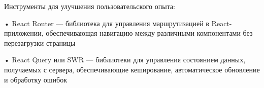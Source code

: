 {  \par \redline Инструменты для улучшения пользовательского опыта:

  \par \redline • React Router — библиотека для управления маршрутизацией в React-приложении, обеспечивающая навигацию между различными компонентами без перезагрузки страницы
  \par \redline • React Query или SWR — библиотеки для управления состоянием данных, получаемых с сервера, обеспечивающие кеширование, автоматическое обновление и обработку ошибок
  \par
}